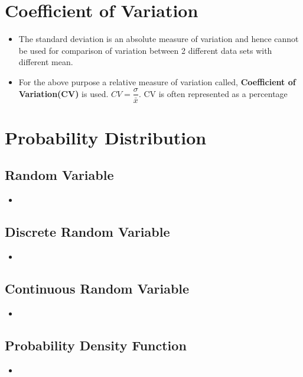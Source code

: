 \documentclass[8pt]{report}
\begin{document}
	\section{Coefficient of Variation}
		\begin{itemize}
			\item The standard deviation is an absolute measure of variation and hence cannot be used for comparison of variation between 2 different data sets with different mean.
			\item For the above purpose a relative measure of variation called, \textbf{Coefficient of Variation(CV)} is used. $\boxed{CV =\dfrac{\sigma}{\bar{x}}}$. CV is often represented as a percentage
		\end{itemize}\hrulefill
	\section{Probability Distribution}
		\subsection{Random Variable}
			\begin{itemize}
				\item
			\end{itemize}\hrulefill
		\subsection{Discrete Random Variable}
			\begin{itemize}
				\item
			\end{itemize}\hrulefill
		\subsection{Continuous Random Variable}
			\begin{itemize}
				\item
			\end{itemize}\hrulefill
		\subsection{Probability Density Function}
			\begin{itemize}
				\item
			\end{itemize}\hrulefill
\end{document}
